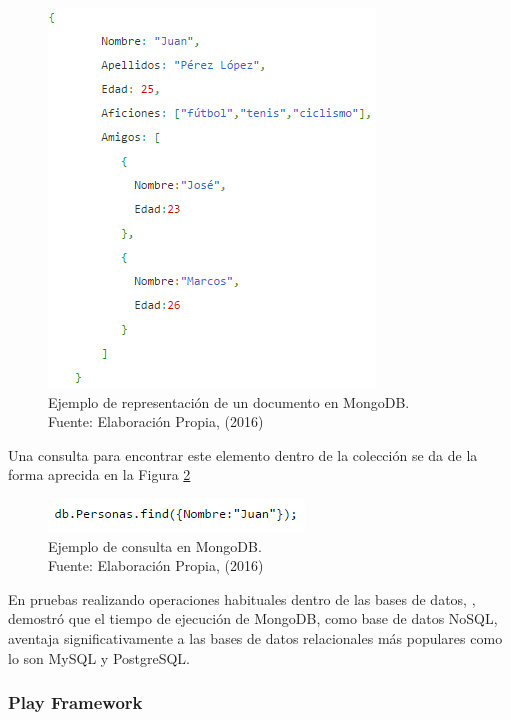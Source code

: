 \begin{figure}[H]
	\centering
	\captionsetup{justification=centering}
	\includegraphics[scale=0.8]{images/MongoJsonExample.png}
	\caption[Ejemplo de representación de un documento en MongoDB.]{Ejemplo de representación de un documento en MongoDB.\\Fuente: Elaboración Propia, (2016)}
	\label{fig:MongoJsonExample}
\end{figure}

Una consulta para encontrar este elemento dentro de la colección se da de la forma aprecida en la Figura \ref{fig:MongoJsonQueryExample}

\begin{figure}[H]
	\centering
	\captionsetup{justification=centering}
	\includegraphics[scale=0.8]{images/MongoJsonQueryExample.png}
	\caption[Ejemplo de consulta en MongoDB.]{Ejemplo de consulta en MongoDB.\\Fuente: Elaboración Propia, (2016)}
	\label{fig:MongoJsonQueryExample}
\end{figure}

En pruebas realizando operaciones habituales dentro de las bases de datos, \cite{MongoPerformance}, demostró que el tiempo de ejecución de MongoDB, como base de datos NoSQL, aventaja significativamente a las bases de datos relacionales más populares como lo son MySQL y PostgreSQL.

\subsubsection*{Play Framework}
\label{subsubsec:playframework}

